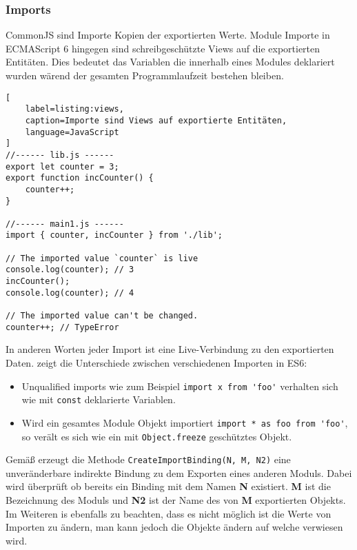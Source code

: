 \subsubsection{Imports}
\label{subsubsection:importes}

CommonJS sind Importe Kopien der exportierten Werte. Module Importe in ECMAScript 6 hingegen sind schreibgeschützte Views auf die exportierten Entitäten. Dies bedeutet das Variablen die innerhalb eines Modules deklariert wurden wärend der gesamten Programmlaufzeit bestehen bleiben. \autocite{AxelRauschmayer2018}


\begin{lstlisting}[
    label=listing:views,
    caption=Importe sind Views auf exportierte Entitäten,
	language=JavaScript
]
//------ lib.js ------
export let counter = 3;
export function incCounter() {
    counter++;
}

//------ main1.js ------
import { counter, incCounter } from './lib';

// The imported value `counter` is live
console.log(counter); // 3
incCounter();
console.log(counter); // 4

// The imported value can't be changed.
counter++; // TypeError
\end{lstlisting}

In anderen Worten jeder Import ist eine Live-Verbindung zu den exportierten Daten. \textcite{AxelRauschmayer2018} zeigt die Unterschiede zwischen verschiedenen Importen in ES6:
\begin{itemize}
\item Unqualified imports wie zum Beispiel \lstinline{import x from 'foo'} verhalten sich wie mit \lstinline{const} deklarierte Variablen.
\item Wird ein gesamtes Module Objekt importiert \lstinline{import * as foo from 'foo'}, so verält es sich wie  ein mit \lstinline{Object.freeze} geschütztes Objekt.
\end{itemize}

Gemäß \textcite{ECMAScript} erzeugt die Methode \lstinline{CreateImportBinding(N, M, N2)} eine unveränderbare indirekte Bindung zu dem Exporten eines anderen Moduls. Dabei wird überprüft ob bereits ein Binding mit dem Namen \textbf{N} existiert. \textbf{M} ist die Bezeichnung des Moduls und \textbf{N2} ist der Name des von \textbf{M} exportierten Objekts.
Im Weiteren is ebenfalls zu beachten, dass es nicht möglich ist die Werte von Importen zu ändern, man kann jedoch die Objekte ändern auf welche verwiesen wird. \autocite{AxelRauschmayer2018}


